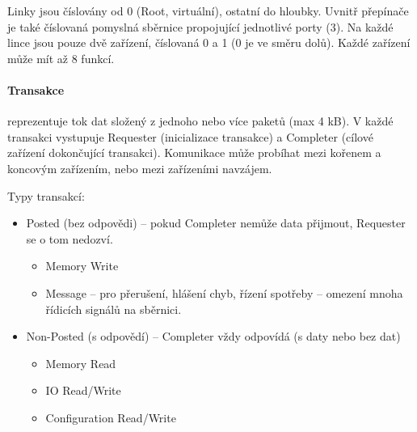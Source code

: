 \documentclass[a4paper, 11pt]{report}
\begin{document}
Linky jsou číslovány od 0 (Root, virtuální), ostatní do hloubky. Uvnitř přepínače je také číslovaná pomyslná sběrnice propojující jednotlivé porty (3). Na každé lince jsou pouze dvě zařízení, číslovaná 0 a 1 (0 je ve směru dolů). Každé zařízení může mít až 8 funkcí.

\paragraph{Transakce} reprezentuje tok dat složený z jednoho nebo více paketů (max 4 kB). V každé transakci vystupuje Requester (inicializace transakce) a Completer (cílové zařízení dokončující transakci). Komunikace může probíhat mezi kořenem a koncovým zařízením, nebo mezi zařízeními navzájem.

Typy transakcí:
\begin{itemize}
	\item Posted (bez odpovědi) -- pokud Completer nemůže data přijmout, Requester se o tom nedozví.
	\begin{itemize}
		\item Memory Write
		\item Message -- pro přerušení, hlášení chyb, řízení spotřeby -- omezení mnoha řídicích signálů na sběrnici.
	\end{itemize}
	\item Non-Posted (s odpovědí) -- Completer vždy odpovídá (s daty nebo bez dat)
	\begin{itemize}
		\item Memory Read
		\item IO Read/Write
		\item Configuration Read/Write
	\end{itemize}
\end{itemize}
\end{document}
